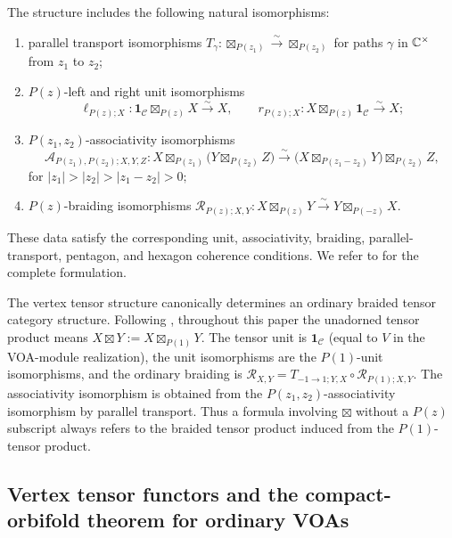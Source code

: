\documentclass[10pt,a4paper]{amsart}
\numberwithin{equation}{section} \newtheorem{thm}{Theorem}[section] \newtheorem{lem}[thm]{Lemma} \newtheorem{ex}[thm]{Example} \newtheorem{prop}[thm]{Proposition} \newtheorem{cor}[thm]{Corollary} \newtheorem{defi}[thm]{Definition} \newtheorem{rmk}[thm]{Remark} \newtheorem{notation}[thm]{Notation}
\begin{document}
The structure includes the following natural isomorphisms:
\begin{enumerate}[label=\textnormal{(\roman*)}]
\item parallel transport isomorphisms
\(T_\gamma:\boxtimes_{P(z_1)}\overset{\sim}{\longrightarrow}\boxtimes_{P(z_2)}\) for paths $\gamma$ in $\mathbb{C}^\times$ from $z_1$ to $z_2$;

\item $P(z)$-left and right unit isomorphisms
\[
\ell_{P(z);X}:
\mathbf 1_{\mathcal C}\boxtimes_{P(z)}X
\overset{\sim}{\longrightarrow}
X,
\qquad
r_{P(z);X}:
X\boxtimes_{P(z)}\mathbf 1_{\mathcal C}
\overset{\sim}{\longrightarrow}
X;
\]

\item $P(z_1,z_2)$-associativity isomorphisms
\[
\mathcal A_{P(z_1),P(z_2);X,Y,Z}:
X\boxtimes_{P(z_1)}
\bigl(Y\boxtimes_{P(z_2)}Z\bigr)
\overset{\sim}{\longrightarrow}
\bigl(X\boxtimes_{P(z_1-z_2)}Y\bigr)
\boxtimes_{P(z_2)}Z,
\]
for \(|z_1|>|z_2|>|z_1-z_2|>0;\)
\item $P(z)$-braiding isomorphisms
\(\mathcal R_{P(z);X,Y}:X\boxtimes_{P(z)}Y\overset{\sim}{\longrightarrow}Y\boxtimes_{P(-z)}X.\)
\end{enumerate}
These data satisfy the corresponding unit, associativity, braiding, parallel-transport, pentagon, and hexagon coherence conditions. We refer to \cite[\S2.1]{McRae} for the complete formulation.

The vertex tensor structure canonically determines an ordinary braided tensor category structure. Following \cite[\S2.1]{McRae}, throughout this paper the unadorned tensor product means \(X\boxtimes Y:=X\boxtimes_{P(1)}Y.\) The tensor unit is $\mathbf 1_{\mathcal C}$ (equal to $V$ in the VOA-module realization), the unit isomorphisms are the $P(1)$-unit isomorphisms, and the ordinary braiding is \(\mathcal R_{X,Y}=T_{-1\to1;Y,X}\circ\mathcal R_{P(1);X,Y}.\) The associativity isomorphism is obtained from the $P(z_1,z_2)$-associativity isomorphism by parallel transport. Thus a formula involving $\boxtimes$ without a $P(z)$ subscript always refers to the braided tensor product induced from the $P(1)$-tensor product.

\subsection{Vertex tensor functors and the compact-orbifold theorem for ordinary VOAs}
\label{subsec:McRae-VOA}
\end{document}
